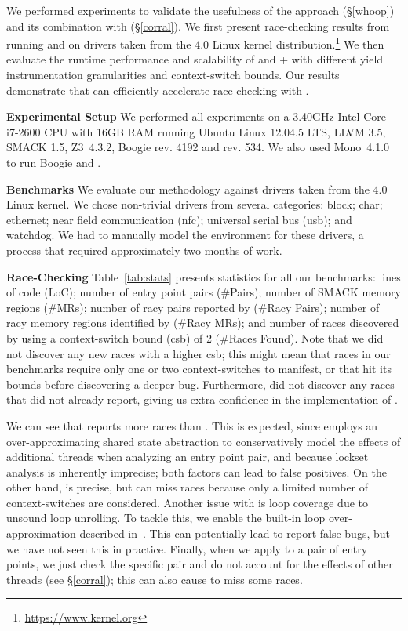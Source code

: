 We performed experiments to validate the usefulness of the \whoop approach (\S\ref{whoop}) and its combination with \corral (\S\ref{corral}). We first present race-checking results from running \whoop and \corral on \sizeOfBenchmarks drivers taken from the 4.0 Linux kernel distribution.\footnote{\url{https://www.kernel.org}} We then evaluate the runtime performance and scalability of \corral and \whoop + \corral with different yield instrumentation granularities and context-switch bounds.
Our results demonstrate that \whoop can efficiently accelerate race-checking with \corral.

\noindent\textbf{Experimental Setup }
%
We performed all experiments on a 3.40GHz Intel Core i7-2600 CPU with 16GB RAM running Ubuntu Linux 12.04.5 LTS, LLVM 3.5, SMACK 1.5, Z3~4.3.2, Boogie rev. 4192 and \corral rev. 534. We also used Mono~4.1.0 to run Boogie and \corral.

\noindent\textbf{Benchmarks }
%
We evaluate our methodology against \sizeOfBenchmarks drivers taken from the 4.0 Linux kernel. We chose non-trivial drivers from several categories: block; char; ethernet; near field communication (nfc); universal serial bus (usb); and watchdog. We had to manually model the environment for these drivers, a process that required approximately two months of work.

\noindent\textbf{Race-Checking }
%
Table~\ref{tab:stats} presents statistics for all our benchmarks: lines of code (LoC); number of entry point pairs (\#Pairs); number of SMACK memory regions (\#MRs); number of racy pairs reported by \whoop (\#Racy Pairs); number of racy memory regions identified by \whoop (\#Racy MRs); and number of races discovered by \corral using a context-switch bound (csb) of 2 (\#Races Found). Note that we did not discover any new races with a higher csb; this might mean that races in our benchmarks require only one or two context-switches to manifest, or that \corral hit its bounds before discovering a deeper bug. Furthermore, \corral did not discover any races that \whoop did not already report, giving us extra confidence in the implementation of \whoop.

We can see that \whoop reports more races than \corral. This is expected, since \whoop employs an over-approximating shared state abstraction to conservatively model the effects of additional threads when analyzing an entry point pair, and because lockset analysis is inherently imprecise; both factors can lead to false positives.  On the other hand, \corral is precise, but can miss races because only a limited number of context-switches are considered.  Another issue with \corral is loop coverage due to unsound loop unrolling. To tackle this, we enable the built-in loop over-approximation described in~\cite{lal2014powering}. This can potentially lead \corral to report false bugs, but we have not seen this in practice. Finally, when we apply \corral to a pair of entry points, we just check the specific pair and do not account for the effects of other threads (see \S\ref{corral}); this can also cause \corral to miss some races.

